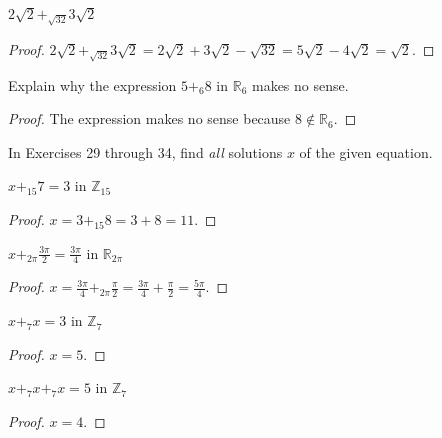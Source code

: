 \begin{exercise}
    $2\sqrt{2} {+}_{\sqrt{32}} 3\sqrt{2}$
\end{exercise}

\begin{proof}
    $2\sqrt{2} {+}_{\sqrt{32}} 3\sqrt{2} = 2\sqrt{2} + 3\sqrt{2} - \sqrt{32} = 5\sqrt{2} - 4\sqrt{2} = \sqrt{2}$.
\end{proof}

\begin{exercise}
    Explain why the expression $5 {+}_{6} 8$ in $\mathbb{R}_{6}$ makes no sense.
\end{exercise}

\begin{proof}
    The expression makes no sense because $8\notin \mathbb{R}_{6}$.
\end{proof}

In Exercises 29 through 34, find \textit{all} solutions $x$ of the given equation.

\begin{exercise}
    $x {+}_{15} 7 = 3$ in $\mathbb{Z}_{15}$
\end{exercise}

\begin{proof}
    $x = 3 {+}_{15} 8 = 3 + 8 = 11$.
\end{proof}

\begin{exercise}
    $x {+}_{2\pi} \frac{3\pi}{2} = \frac{3\pi}{4}$ in $\mathbb{R}_{2\pi}$
\end{exercise}

\begin{proof}
    $x = \frac{3\pi}{4} {+}_{2\pi} \frac{\pi}{2} = \frac{3\pi}{4} + \frac{\pi}{2} = \frac{5\pi}{4}$.
\end{proof}

\begin{exercise}
    $x {+}_{7} x = 3$ in $\mathbb{Z}_{7}$
\end{exercise}

\begin{proof}
    $x = 5$.
\end{proof}

\begin{exercise}
    $x {+}_{7} x {+}_{7} x = 5$ in $\mathbb{Z}_{7}$
\end{exercise}

\begin{proof}
    $x = 4$.
\end{proof}


